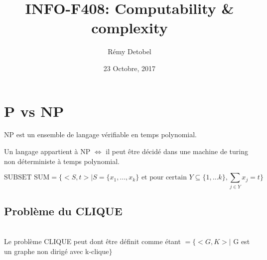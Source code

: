 \documentclass[a4paper,12pt]{article}
\title{INFO-F408: Computability \& complexity}
\date{23 Octobre, 2017}
\author{Rémy Detobel}
\begin{document}
\maketitle
\newpage

\section{P vs NP}
  \begin{defBox}
    NP est un ensemble de langage vérifiable en temps polynomial.
  \end{defBox}
  \begin{theoremeBox}
    Un langage appartient à NP $\Leftrightarrow$ il peut être décidé dans une machine de turing non déterministe à temps polynomial.
  \end{theoremeBox}

  $$\text{SUBSET SUM} = \Big\{<S, t> | S = \{x_1, ..., x_k\} \text{ et pour certain } Y \subseteq \{1, ... k\}, \sum\limits_{j \in Y} x_j = t \Big\}$$
  
  \subsection{Problème du CLIQUE}
    \\
    Le problème CLIQUE peut dont être définit comme étant $= \big\{<G, K> |$ G est un graphe non dirigé avec k-clique$\big\}$\\
    
\end{document}
